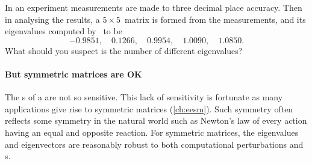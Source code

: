 \begin{example}
\begin{enumerate}
\end{enumerate}
\end{example}






\begin{activity}
In an experiment measurements are made to three decimal place accuracy.
Then in analysing the results, a \(5\times5\)~matrix is formed from the measurements, and its eigenvalues computed by \script\ to be
\begin{equation*}
-0.9851,\quad
0.1266,\quad
0.9954,\quad
1.0090,\quad
1.0850.
\end{equation*}
What should you suspect is the number of different eigenvalues?
\end{activity}









\paragraph{But symmetric matrices are OK}
The s of a  are not so sensitive.
This lack of sensitivity is fortunate as many applications give rise to symmetric matrices (\autoref{ch:eesm}).
Such symmetry often reflects some symmetry in the natural world such as Newton's law of every action having an equal and opposite reaction.
For symmetric matrices, the eigenvalues and eigenvectors are reasonably robust to both computational perturbations and s.




